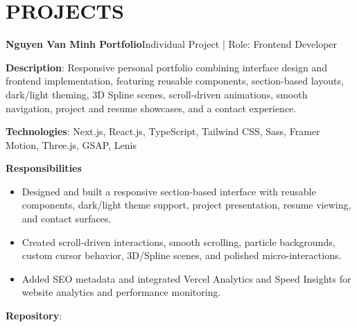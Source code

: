 \section{PROJECTS}
\resumeSubHeadingListStart

  \resumeProjectHeading
    {\textbf{Nguyen Van Minh Portfolio}}{Individual Project | Role: Frontend Developer}
    \resumeItemListStart
      \item \textbf{Description}: Responsive personal portfolio combining interface design and frontend implementation, featuring reusable components, section-based layouts, dark/light theming, 3D Spline scenes, scroll-driven animations, smooth navigation, project and resume showcases, and a contact experience.
      \item \textbf{Technologies}: Next.js, React.js, TypeScript, Tailwind CSS, Sass, Framer Motion, Three.js, GSAP, Lenis
      \item \textbf{Responsibilities}
        \begin{itemize}
          \item Designed and built a responsive section-based interface with reusable components, dark/light theme support, project presentation, resume viewing, and contact surfaces.
          \item Created scroll-driven interactions, smooth scrolling, particle backgrounds, custom cursor behavior, 3D/Spline scenes, and polished micro-interactions.
          \item Added SEO metadata and integrated Vercel Analytics and Speed Insights for website analytics and performance monitoring.
        \end{itemize}
      \item \textbf{Repository}: \href{https://github.com/nvminh162/nguyenvanminh-portfolio-web}{}
    \resumeItemListEnd

